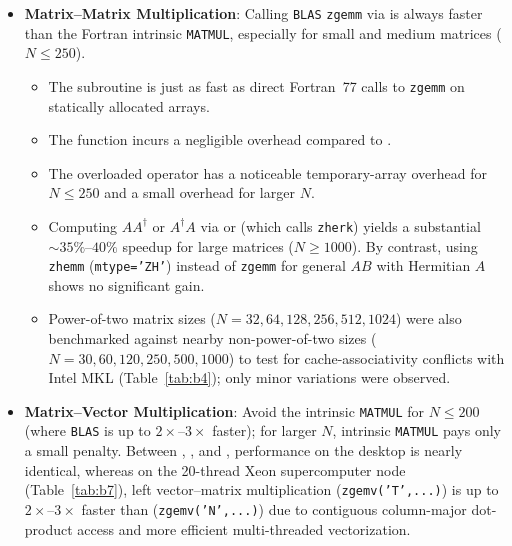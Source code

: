 \begin{notebox}
\begin{itemize}
  \item \textbf{Matrix--Matrix Multiplication}: Calling \texttt{BLAS} \texttt{zgemm} via  is always faster than the Fortran intrinsic \texttt{MATMUL}, especially for small and medium matrices ($N \le 250$).
  \begin{itemize}
    \item The subroutine  is just as fast as direct Fortran~77 calls to \texttt{zgemm} on statically allocated arrays.
    \item The function  incurs a negligible overhead compared to .
    \item The overloaded operator  has a noticeable temporary-array overhead for $N \le 250$ and a small overhead for larger $N$.
    \item Computing $A A^\dagger$ or $A^\dagger A$ via  or  (which calls \texttt{zherk}) yields a substantial $\sim 35\%$--$40\%$ speedup for large matrices ($N \ge 1000$). By contrast, using \texttt{zhemm} (\texttt{mtype='ZH'}) instead of \texttt{zgemm} for general $A B$ with Hermitian $A$ shows no significant gain.
    \item Power-of-two matrix sizes ($N = 32, 64, 128, 256, 512, 1024$) were also benchmarked against nearby non-power-of-two sizes ($N = 30, 60, 120, 250, 500, 1000$) to test for cache-associativity conflicts with Intel MKL (Table~\ref{tab:b4}); only minor variations were observed.
  \end{itemize}
  \item \textbf{Matrix--Vector Multiplication}: Avoid the intrinsic \texttt{MATMUL} for $N \le 200$ (where \texttt{BLAS} is up to $2\times$--$3\times$ faster); for larger $N$, intrinsic \texttt{MATMUL} pays only a small penalty. Between , , and , performance on the desktop is nearly identical, whereas on the 20-thread Xeon supercomputer node (Table~\ref{tab:b7}), left vector--matrix multiplication  (\texttt{zgemv('T',...)}) is up to $2\times$--$3\times$ faster than  (\texttt{zgemv('N',...)}) due to contiguous column-major dot-product access and more efficient multi-threaded vectorization.
\end{itemize}
\end{notebox}

